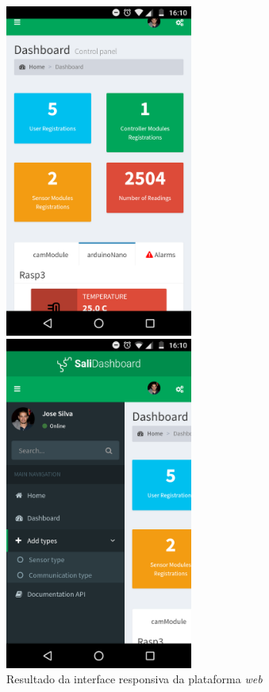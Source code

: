 \begin{figure}[h]
	\centering
	\begin{minipage}[b]{0.495\textwidth}
		\centering
		\includegraphics[width=0.55\textwidth]{img/mobileprint1.png}
	\end{minipage}
	\hfill
	\begin{minipage}[b]{0.495\textwidth}
		\centering
		\includegraphics[width=0.55\textwidth]{img/mobileprint2.png}
	\end{minipage}
	\caption{Resultado da interface responsiva da plataforma \textit{web}}
			\label{responsiveinterface}
\end{figure}


